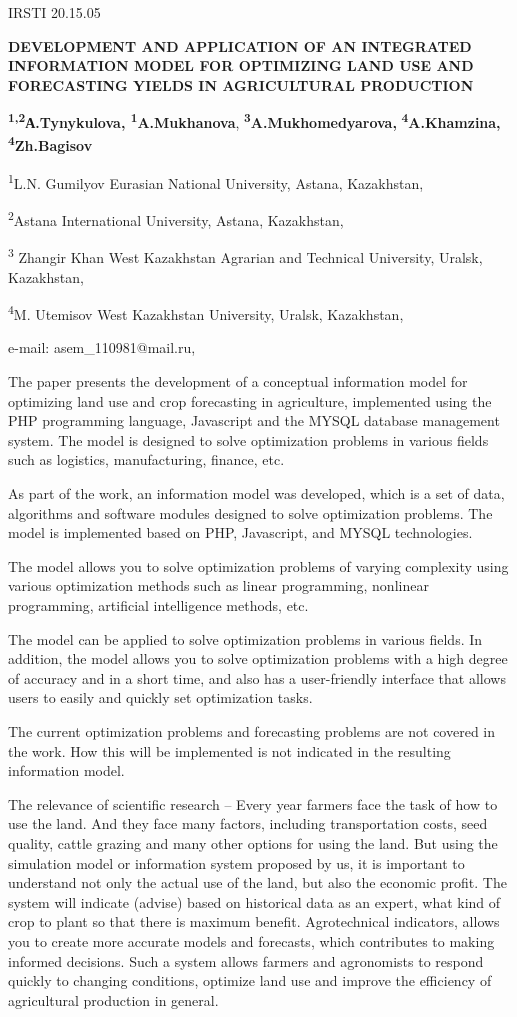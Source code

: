 IRSTI 20.15.05

\textbf{DEVELOPMENT AND APPLICATION OF AN INTEGRATED INFORMATION MODEL
FOR OPTIMIZING LAND USE AND FORECASTING YIELDS IN AGRICULTURAL
PRODUCTION}

\textbf{\textsuperscript{1,2}А.Tynykulova,
\textsuperscript{1}A.Mukhanova},
\textbf{\textsuperscript{3}A.Mukhomedyarova,}
\textbf{\textsuperscript{4}A.Khamzina, \textsuperscript{4}Zh.Bagisov}

\textsuperscript{1}L.N. Gumilyov Eurasian National University, Astana,
Kazakhstan,

\textsuperscript{2}Astana International University, Astana, Kazakhstan,

\textsuperscript{3} Zhangir Khan West Kazakhstan Agrarian and Technical
University, Uralsk, Kazakhstan,

\textsuperscript{4}M. Utemisov West Kazakhstan University, Uralsk,
Kazakhstan,

e-mail: asem\_110981@mail.ru,

The paper presents the development of a conceptual information model for
optimizing land use and crop forecasting in agriculture, implemented
using the PHP programming language, Javascript and the MYSQL database
management system. The model is designed to solve optimization problems
in various fields such as logistics, manufacturing, finance, etc.

As part of the work, an information model was developed, which is a set
of data, algorithms and software modules designed to solve optimization
problems. The model is implemented based on PHP, Javascript, and MYSQL
technologies.

The model allows you to solve optimization problems of varying
complexity using various optimization methods such as linear
programming, nonlinear programming, artificial intelligence methods,
etc.

The model can be applied to solve optimization problems in various
fields. In addition, the model allows you to solve optimization problems
with a high degree of accuracy and in a short time, and also has a
user-friendly interface that allows users to easily and quickly set
optimization tasks.

The current optimization problems and forecasting problems are not
covered in the work. How this will be implemented is not indicated in
the resulting information model.

The relevance of scientific research -- Every year farmers face the task
of how to use the land. And they face many factors, including
transportation costs, seed quality, cattle grazing and many other
options for using the land. But using the simulation model or
information system proposed by us, it is important to understand not
only the actual use of the land, but also the economic profit. The
system will indicate (advise) based on historical data as an expert,
what kind of crop to plant so that there is maximum benefit.
Agrotechnical indicators, allows you to create more accurate models and
forecasts, which contributes to making informed decisions. Such a system
allows farmers and agronomists to respond quickly to changing
conditions, optimize land use and improve the efficiency of agricultural
production in general.

